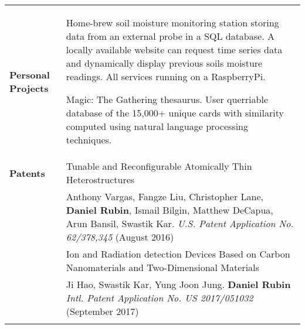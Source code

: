 \documentclass{article}
\begin{document}
\begin{center}
\begin{tabularx}{\linewidth}{>{\raggedright\bf\large{}}p{3.0cm}X}
Personal Projects & 
	\begin{compactitem}
	\item Home-brew soil moisture monitoring station storing data from an external probe in a SQL database. A locally available website can request time series data and dynamically display previous soils moisture readings. All services running on a RaspberryPi.
	\item Magic: The Gathering thesaurus. User querriable database of the 15,000+ unique cards with similarity computed using natural language processing techniques. 
	\end{compactitem} \\

Patents &  \large{Tunable and Reconfigurable Atomically Thin Heterostructures}\\
 & Anthony Vargas, Fangze Liu, Christopher Lane, {\bf Daniel Rubin}, Ismail Bilgin, Matthew DeCapua, Arun Bansil, Swastik Kar. {\it U.S. Patent Application No. 62/378,345}  (August 2016)\\
\rule{0pt}{0.5cm}  & \large{Ion and Radiation detection Devices Based on Carbon Nanomaterials and Two-Dimensional Materials}\\
 & Ji Hao, Swastik Kar, Yung Joon Jung. {\bf Daniel Rubin} {\it Intl. Patent Application No. US 2017/051032} (September 2017)\\
 & \\ %


\end{tabularx}
\end{center}
\end{document}
